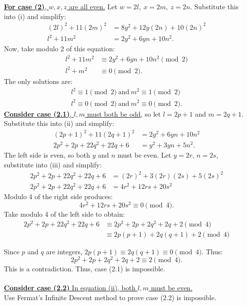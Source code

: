 \documentclass{article}
\begin{document}
\underline{\textbf{For case (2)}, $w,x,z$ are all even.} Let $w = 2l,\ x = 2m,\ z = 2n$. Substitute this into (i) and simplify:
\begin{align*}
    (2l)^2 + 11(2m)^2 &= 8y^2 + 12y(2n) + 10(2n)^2 \\
    l^2 + 11m^2 &= 2y^2 + 6yn + 10n^2. \tag{ii}
\end{align*}
Now, take modulo $2$ of this equation:
\begin{align*}
    l^2 + 11m^2 &\equiv 2y^2 + 6yn + 10n^2 \pmod 2 \\
    l^2 + m^2 &\equiv 0 \pmod 2.
\end{align*}
The only solutions are:
\begin{align*}
    l^2 \equiv 1 \pmod 2 \ \text{and}\ m^2 \equiv 1 \pmod 2 \tag{2.1} \\
    l^2 \equiv 0 \pmod 2 \ \text{and}\ m^2 \equiv 0 \pmod 2. \tag{2.2}
\end{align*}
\newpage
\underline{\textbf{Consider case (2.1)}, $l,m$ must both be odd,} so let $l = 2p + 1$ and $m = 2q + 1$. Substitute this into (ii) and simplify:
\begin{align*}
    (2p + 1)^2 + 11(2q + 1)^2 &= 2y^2 + 6yn + 10n^2 \\
    2p^2 + 2p + 22q^2 + 22q + 6 &= y^2 + 3yn + 5n^2. \tag{iii}
\end{align*}
The left side is even, so both $y$ and $n$ must be even. Let $y = 2r$, $n = 2s$, substitute into (iii) and simplify:
\begin{align*}
    2p^2 + 2p + 22q^2 + 22q + 6 &= (2r)^2 + 3(2r)(2s) + 5(2s)^2 \\
    2p^2 + 2p + 22q^2 + 22q + 6 &= 4r^2 + 12rs + 20s^2
\end{align*}
Modulo 4 of the right side produces:
$$4r^2 + 12rs + 20s^2 \equiv 0 \pmod 4.$$
Take modulo 4 of the left side to obtain:
\begin{align*}
    2p^2 + 2p + 22q^2 + 22q + 6 &\equiv 2p^2 + 2p + 2q^2 + 2q + 2 \pmod 4 \\
    &\equiv 2p(p + 1) + 2q(q+1) + 2 \pmod 4
\end{align*}

Since $p$ and $q$ are integers, $2p(p + 1) \equiv 2q(q+1) \equiv 0 \pmod 4$. Thus:
$$2p^2 + 2p + 2q^2 + 2q + 2 \equiv 2 \pmod 4.$$
This is a contradiction. Thus, case (2.1) is impossible.\\ \\

\underline{\textbf{Consider case (2.2)} In equation (ii), both $l,m$ must be even.} \\
Use Fermat's Infinite Descent method to prove case (2.2) is impossible. \\
\end{document}
